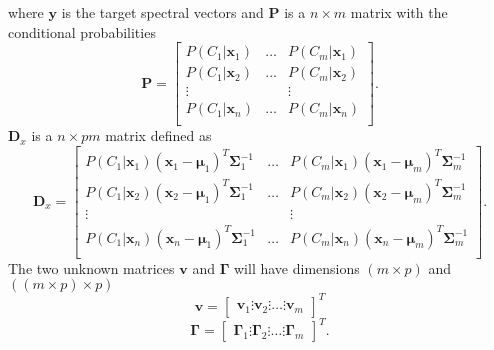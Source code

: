 where $\mathbf{y}$ is the target spectral vectors and $\mathbf{P}$ is a $n \times m$ matrix with the conditional probabilities
\begin{equation}
	\mathbf{P} = \begin{bmatrix}
		P(C_1\vert \mathbf{x}_1) & \dots & P(C_m\vert \mathbf{x}_1) \\
		P(C_1\vert \mathbf{x}_2) & \dots & P(C_m\vert \mathbf{x}_2) \\
		\vdots & & \vdots \\
		P(C_1\vert \mathbf{x}_n) & \dots & P(C_m\vert \mathbf{x}_n) \\
	\end{bmatrix}.
\end{equation}
$\mathbf{D}_x$ is a $n \times pm$ matrix defined as
\begin{equation}
	\mathbf{D}_x = \begin{bmatrix}
		P(C_1\vert \mathbf{x}_1)(\mathbf{x}_1 - \boldsymbol{\mu}_1)^T\mathbf{\Sigma}_1^{-1} & \dots & P(C_m\vert \mathbf{x}_1)(\mathbf{x}_1 - \boldsymbol{\mu}_m)^T\mathbf{\Sigma}_m^{-1} \\
		P(C_1\vert \mathbf{x}_2)(\mathbf{x}_2 - \boldsymbol{\mu}_1)^T\mathbf{\Sigma}_1^{-1} & \dots & P(C_m\vert \mathbf{x}_2)(\mathbf{x}_2 - \boldsymbol{\mu}_m)^T\mathbf{\Sigma}_m^{-1} \\
		\vdots & & \vdots \\
		P(C_1\vert \mathbf{x}_n)(\mathbf{x}_n - \boldsymbol{\mu}_1)^T\mathbf{\Sigma}_1^{-1} & \dots & P(C_m\vert \mathbf{x}_n)(\mathbf{x}_n - \boldsymbol{\mu}_m)^T\mathbf{\Sigma}_m^{-1} \\
	\end{bmatrix}.
\end{equation}
The two unknown matrices $\mathbf{v}$ and $ \mathbf{\Gamma}$ will have dimensions $(m\times p)$ and $((m\times p) \times p)$ 
\begin{equation}
	\mathbf{v} = 
	\begin{bmatrix}
		\mathbf{v}_1 \vdots \mathbf{v}_2 \vdots \dots \vdots \mathbf{v}_m
	\end{bmatrix}^T
\end{equation}
\begin{equation}
	\mathbf{\Gamma} = 
	\begin{bmatrix}
		\mathbf{\Gamma}_1 \vdots \mathbf{\Gamma}_2 \vdots \dots \vdots \mathbf{\Gamma}_m
	\end{bmatrix}^T.
\end{equation}
